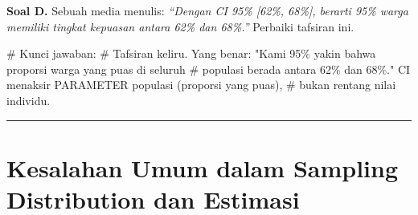 \documentclass[
  indonesian,
  letterpaper,
]{book}
\newenvironment{Shaded}{\begin{snugshade}}{\end{snugshade}}
\newcommand{\CommentTok}[1]{\textcolor[rgb]{0.37,0.37,0.37}{#1}}
\newcommand{\DecValTok}[1]{\textcolor[rgb]{0.68,0.00,0.00}{#1}}
\newcommand{\FloatTok}[1]{\textcolor[rgb]{0.68,0.00,0.00}{#1}}
\newcommand{\FunctionTok}[1]{\textcolor[rgb]{0.28,0.35,0.67}{#1}}
\newcommand{\NormalTok}[1]{\textcolor[rgb]{0.00,0.23,0.31}{#1}}
\newcommand{\OtherTok}[1]{\textcolor[rgb]{0.00,0.23,0.31}{#1}}
\newcommand{\SpecialCharTok}[1]{\textcolor[rgb]{0.37,0.37,0.37}{#1}}
\begin{document}
\begin{Shaded}
\end{Shaded}

\textbf{Soal D.} Sebuah media menulis: \emph{``Dengan CI 95\% {[}62\%,
68\%{]}, berarti 95\% warga memiliki tingkat kepuasan antara 62\% dan
68\%.''} Perbaiki tafsiran ini.

\begin{Shaded}
\begin{Highlighting}[]
\CommentTok{\# Kunci jawaban:}
\CommentTok{\# Tafsiran keliru. Yang benar: "Kami 95\% yakin bahwa proporsi warga yang puas di seluruh}
\CommentTok{\# populasi berada antara 62\% dan 68\%." CI menaksir PARAMETER populasi (proporsi yang puas),}
\CommentTok{\# bukan rentang nilai individu.}
\end{Highlighting}
\end{Shaded}

\begin{center}\rule{0.5\linewidth}{0.5pt}\end{center}

\section{Kesalahan Umum dalam Sampling Distribution dan
Estimasi}\label{kesalahan-umum-dalam-sampling-distribution-dan-estimasi}
\end{document}

